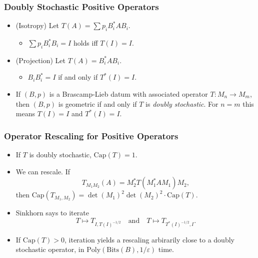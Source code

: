 \documentclass[handout,usenames,dvipsnames,12pt]{beamer}
\begin{document}
\begin{frame}
    \frametitle{Doubly Stochastic Positive Operators}

    \begin{itemize}
        \item (Isotropy) Let $T(A) = \sum p_i B_i^* A B_i$.
        \begin{itemize}
            \pause
            \item $\sum p_i B_i^* B_i = I$ holds iff $T(I) = I$.
        \end{itemize}

        \pause
        \item (Projection) Let $T(A) = B_i^* A B_i$.
        \begin{itemize}
            \pause
            \item $B_i B_i^* = I$ if and only if $T^*(I) = I$.
        \end{itemize}

        \pause
        \item If $(B,p)$ is a Brascamp-Lieb datum with associated operator $T: M_n \to M_m$, then $(B,p)$ is geometric if and only if $T$ is \emph{doubly stochastic}. For $n = m$ this means $T(I) = I$ and $T^*(I) = I$.
    \end{itemize}
\end{frame}

\begin{frame}
    \frametitle{Operator Rescaling for Positive Operators}

    \begin{itemize}
        \item If $T$ is doubly stochastic, $\text{Cap}(T) = 1$.

        \pause
        \item We can rescale. If
        \[ T_{M_1M_2}(A) = M_2^* T(M_1^* A M_1) M_2, \]
        then $\text{Cap}(T_{M_1,M_2}) = \det(M_1)^2 \det(M_2)^2 \cdot \text{Cap}(T)$.

        \pause
        \item Sinkhorn says to iterate
        \[ T \mapsto T_{I,T(I)^{-1/2}} \quad\text{and}\quad T \mapsto T_{T^*(I)^{-1/2}, I}. \]

        \pause
        \item If $\text{Cap}(T) > 0$, iteration yields a rescaling arbirarily close to a doubly stochastic operator, in $\text{Poly}(\text{Bits}(B), 1/\varepsilon)$ time.
    \end{itemize}
\end{frame}
\end{document}
